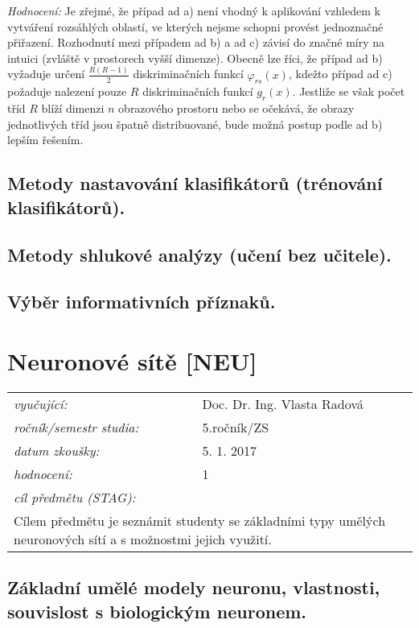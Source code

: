 \textit{Hodnocení:} Je zřejmé, že případ ad a) není vhodný k aplikování vzhledem k vytváření rozsáhlých oblastí, ve kterých nejsme schopni provést jednoznačné přiřazení. Rozhodnutí mezi případem ad b) a ad c) závisí do značné míry na intuici (zvláště v prostorech vyšší dimenze). Obecně lze říci, že případ ad b) vyžaduje určení $ \frac{R(R-1)}{2} $ diskriminačních funkcí $ \varphi_{rs}(x) $, kdežto případ ad c) požaduje nalezení pouze $ R $ diskriminačních funkcí $ g_r(x) $. Jestliže se však počet tříd $ R $ blíží dimenzi $ n $ obrazového prostoru nebo se očekává, že obrazy jednotlivých tříd jsou špatně distribuované, bude možná postup podle ad b) lepším řešením.

\subsection{Metody nastavování klasifikátorů (trénování klasifikátorů).}


\subsection{Metody shlukové analýzy (učení bez učitele).}

\subsection{Výběr informativních příznaků.}

\section{Neuronové sítě [NEU]}

\begin{table}[H]
\centering
\begin{tabular}{p{4cm} p{12cm}}
\textit{vyučující:}             & Doc. Dr. Ing. Vlasta Radová \\
\textit{ročník/semestr studia:} & 5.ročník/ZS \\
\textit{datum zkoušky:}         & 5. 1. 2017 \\
\textit{hodnocení:}             & 1 \\
\textit{cíl předmětu (STAG):}   & \\
\multicolumn{2}{p{16cm}}{Cílem předmětu je seznámit studenty se základními typy umělých neuronových sítí a s možnostmi jejich využití.}
\end{tabular}
\end{table}

\subsection{Základní umělé modely neuronu, vlastnosti, souvislost s biologickým neuronem.}

